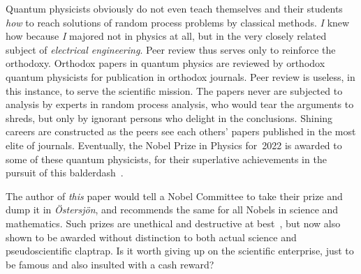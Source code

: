 \documentclass[9pt,technote]{IEEEtran}
\begin{document}
Quantum physicists obviously do not even teach themselves and their
students {\em{how}} to reach solutions of random process problems by
classical methods. {\em{I}} knew how because {\em{I}} majored not in
physics at all, but in the very closely related subject of
{\em{electrical engineering}}. Peer review thus serves only to
reinforce the orthodoxy. Orthodox papers in quantum physics are
reviewed by orthodox quantum physicists for publication in orthodox
journals. Peer review is useless, in this instance, to serve the
scientific mission. The papers never are subjected to analysis by
experts in random process analysis, who would tear the arguments to
shreds, but only by ignorant persons who delight in the
conclusions. Shining careers are constructed as the peers see each
others’ papers published in the most elite of journals. Eventually,
the Nobel Prize in Physics for~2022 is awarded to some of these
quantum physicists, for their superlative achievements in the pursuit
of this balderdash~\cite{enwiki:1169021780}.

The author of {\em{this}} paper would tell a Nobel Committee to take
their prize and dump it in {\em{Östersjön}}, and recommends the same
for all Nobels in science and mathematics. Such prizes are unethical
and destructive at best~\cite{kohn1993punished,sciencemag:nobelbad},
but now also shown to be awarded without distinction to both actual
science and pseudoscientific claptrap. Is it worth giving up on the
scientific enterprise, just to be famous and also insulted with a cash
reward?

{}

\end{document}
